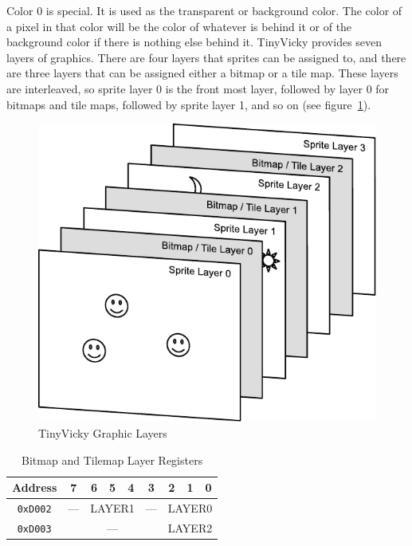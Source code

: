 Color 0 is special. It is used as the transparent or background color. The color of a pixel in that color will be the color of whatever is behind it or of the background color if there is nothing else behind it. TinyVicky provides seven layers of graphics. There are four layers that sprites can be assigned to, and there are three layers that can be assigned either a bitmap or a tile map. These layers are interleaved, so sprite layer 0 is the front most layer, followed by layer 0 for bitmaps and tile maps, followed by sprite layer 1, and so on (see figure~\ref{fig:layers}).

\begin{figure}[h]
    \begin{center}
        \includegraphics{images/Layers.pdf}
    \end{center}
    \caption{TinyVicky Graphic Layers}
    \label{fig:layers}
\end{figure}

\begin{table}[h]
    \begin{center}
        \begin{tabular}{|c|c|c|c|c|c|c|c|c|} \hline
            Address & 7 & 6 & 5 & 4 & 3 & 2 & 1 & 0 \\ \hline\hline
            \verb+0xD002+ & --- & \multicolumn{3}{|c|}{LAYER1} & --- & \multicolumn{3}{|c|}{LAYER0} \\\hline
            \verb+0xD003+ & \multicolumn{5}{|c|}{---} & \multicolumn{3}{|c|}{LAYER2} \\\hline
        \end{tabular}
    \end{center}
    \caption{Bitmap and Tilemap Layer Registers}
    \label{tab:bm_tm_layers}
\end{table}


